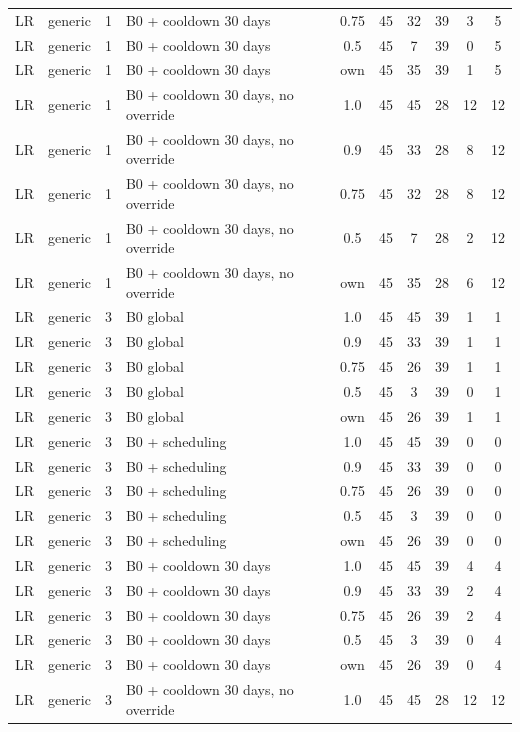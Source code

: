 \begin{longtable}{lllp{4.4cm}cccccc}
LR & generic & 1 & B0 + cooldown 30 days & 0.75 & 45 & 32 & 39 & 3 & 5 \\
LR & generic & 1 & B0 + cooldown 30 days & 0.5 & 45 & 7 & 39 & 0 & 5 \\
LR & generic & 1 & B0 + cooldown 30 days & own & 45 & 35 & 39 & 1 & 5 \\
LR & generic & 1 & B0 + cooldown 30 days, no override & 1.0 & 45 & 45 & 28 & 12 & 12 \\
LR & generic & 1 & B0 + cooldown 30 days, no override & 0.9 & 45 & 33 & 28 & 8 & 12 \\
LR & generic & 1 & B0 + cooldown 30 days, no override & 0.75 & 45 & 32 & 28 & 8 & 12 \\
LR & generic & 1 & B0 + cooldown 30 days, no override & 0.5 & 45 & 7 & 28 & 2 & 12 \\
LR & generic & 1 & B0 + cooldown 30 days, no override & own & 45 & 35 & 28 & 6 & 12 \\
LR & generic & 3 & B0 global & 1.0 & 45 & 45 & 39 & 1 & 1 \\
LR & generic & 3 & B0 global & 0.9 & 45 & 33 & 39 & 1 & 1 \\
LR & generic & 3 & B0 global & 0.75 & 45 & 26 & 39 & 1 & 1 \\
LR & generic & 3 & B0 global & 0.5 & 45 & 3 & 39 & 0 & 1 \\
LR & generic & 3 & B0 global & own & 45 & 26 & 39 & 1 & 1 \\
LR & generic & 3 & B0 + scheduling & 1.0 & 45 & 45 & 39 & 0 & 0 \\
LR & generic & 3 & B0 + scheduling & 0.9 & 45 & 33 & 39 & 0 & 0 \\
LR & generic & 3 & B0 + scheduling & 0.75 & 45 & 26 & 39 & 0 & 0 \\
LR & generic & 3 & B0 + scheduling & 0.5 & 45 & 3 & 39 & 0 & 0 \\
LR & generic & 3 & B0 + scheduling & own & 45 & 26 & 39 & 0 & 0 \\
LR & generic & 3 & B0 + cooldown 30 days & 1.0 & 45 & 45 & 39 & 4 & 4 \\
LR & generic & 3 & B0 + cooldown 30 days & 0.9 & 45 & 33 & 39 & 2 & 4 \\
LR & generic & 3 & B0 + cooldown 30 days & 0.75 & 45 & 26 & 39 & 2 & 4 \\
LR & generic & 3 & B0 + cooldown 30 days & 0.5 & 45 & 3 & 39 & 0 & 4 \\
LR & generic & 3 & B0 + cooldown 30 days & own & 45 & 26 & 39 & 0 & 4 \\
LR & generic & 3 & B0 + cooldown 30 days, no override & 1.0 & 45 & 45 & 28 & 12 & 12 \\

\end{longtable}
